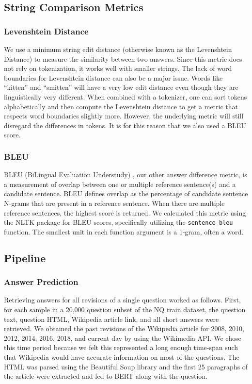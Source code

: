 \documentclass{article}
\begin{document}
\subsection{String Comparison Metrics}
\label{string methods}


\subsubsection{Levenshtein Distance}
\label{fuzzy}

We use a minimum string edit distance (otherwise known as the Levenshtein
Distance) to measure the similarity between two answers. Since this metric does
not rely on tokenization, it works well with smaller strings. The lack of word
boundaries for Levenshtein distance can also be a major issue. Words like
“kitten” and “smitten” will have a very low edit distance even though they are
linguistically very different. When combined with a tokenizer, one can sort
tokens alphabetically and then compute the Levenshtein distance to get a metric
that respects word boundaries slightly more. However, the underlying metric will
still disregard the differences in tokens. It is for this reason that we also
used a BLEU score.


\subsubsection{BLEU}
\label{bleumetric}


BLEU (BiLingual Evaluation Understudy) \cite{bleu}, our other answer difference
metric, is a measurement of overlap between one or multiple reference
sentence(s) and a candidate sentence. BLEU defines overlap as the percentage of
candidate sentence N-grams that are present in a reference sentence. When there
are multiple reference sentences, the highest score is returned. We calculated
this metric using the NLTK \cite{nltk} package for BLEU scores, specifically
utilizing the {\tt sentence\_bleu} function. The smallest unit in each function
argument is a 1-gram, often a word.


\subsection{Pipeline}
\label{pipeline}

\subsubsection{Answer Prediction}
Retrieving answers for all revisions of a single question worked as follows.
First, for each sample in a 20,000 question subset of the NQ train dataset, the
question text, question HTML, Wikipedia article link, and all short answers were
retrieved. We obtained the past revisions of the Wikipedia article for 2008,
2010, 2012, 2014, 2016, 2018, and current day by using the Wikimedia API. We
chose this time period because we felt this represented a long enough time-span
such that Wikipedia would have accurate information on most of the questions.
The HTML was parsed using the Beautiful Soup library and the first 25 paragraphs
of the article were extracted and fed to BERT along with the question.
\end{document}
